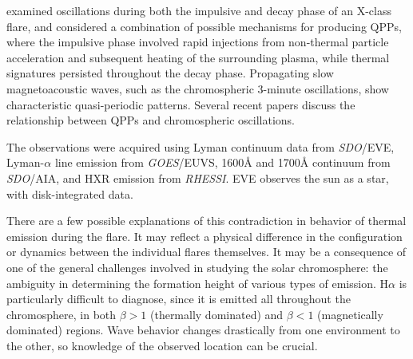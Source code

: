 \cite{Hayes2016} examined oscillations during
both the impulsive and decay phase of an X-class flare, and considered
a combination of possible mechanisms for producing QPPs, where the
impulsive phase involved rapid injections from non-thermal particle
acceleration and subsequent heating of the surrounding plasma, while
thermal signatures persisted throughout the decay phase.
Propagating slow magnetoacoustic waves, such as the chromospheric
3-minute oscillations, show characteristic quasi-periodic patterns.
Several recent papers discuss the relationship between QPPs and
chromospheric oscillations.

The observations were acquired using
Lyman continuum data from \textit{SDO}/EVE,
Lyman-$\alpha$ line emission from \textit{GOES}/EUVS,
1600\AA{} and 1700\AA{} continuum from \textit{SDO}/AIA, and
HXR emission from \textit{RHESSI}.
EVE observes the sun as a star, with disk-integrated data.

\begin{framed}


    There are a few possible explanations of this
    contradiction in behavior of thermal emission during the flare.
    It may reflect a physical difference in the configuration or dynamics
    between the individual flares themselves.
    It may be a consequence of
    one of the general challenges involved in studying the solar
    chromosphere: the ambiguity in determining the formation height of various
    types of emission.
    H$\alpha$ is particularly difficult to diagnose, since it is
    emitted all throughout the chromosphere, in both
    $\beta > 1$ (thermally dominated) and
    $\beta < 1$ (magnetically dominated) regions.
    Wave behavior changes drastically from one environment to the other, so
    knowledge of the observed location can be crucial.

\end{framed}
